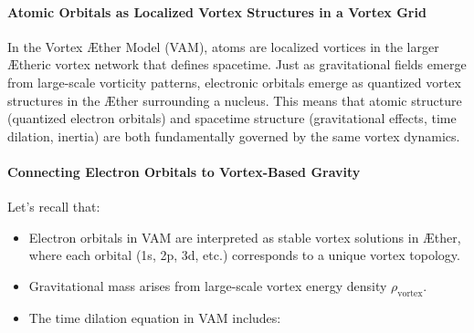 \paragraph{Atomic Orbitals as Localized Vortex Structures in a Vortex Grid}
In the Vortex Æther Model (VAM), atoms are localized vortices in the larger Ætheric vortex network that defines spacetime.
Just as gravitational fields emerge from large-scale vorticity patterns, electronic orbitals emerge as quantized vortex structures in the Æther surrounding a nucleus.
This means that atomic structure (quantized electron orbitals) and spacetime structure (gravitational effects, time dilation, inertia) are both fundamentally governed by the same vortex dynamics.

\paragraph{Connecting Electron Orbitals to Vortex-Based Gravity}
Let’s recall that:
\begin{itemize}
    \item Electron orbitals in VAM are interpreted as stable vortex solutions in Æther, where each orbital (1s, 2p, 3d, etc.) corresponds to a unique vortex topology.
    \item Gravitational mass arises from large-scale vortex energy density $\rho_{\text{vortex}}$.
    \item The time dilation equation in VAM includes:
\end{itemize}

